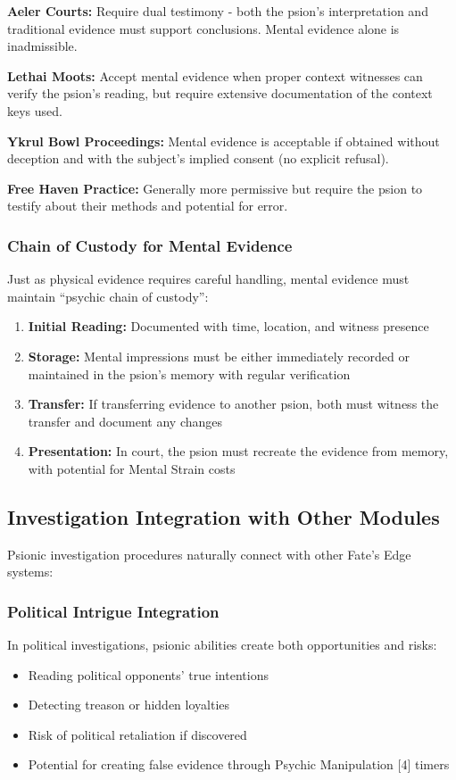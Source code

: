 \documentclass[11pt,twoside]{article}
\begin{document}
\textbf{Aeler Courts:} Require dual testimony - both the psion's interpretation and traditional evidence must support conclusions. Mental evidence alone is inadmissible.

\textbf{Lethai Moots:} Accept mental evidence when proper context witnesses can verify the psion's reading, but require extensive documentation of the context keys used.

\textbf{Ykrul Bowl Proceedings:} Mental evidence is acceptable if obtained without deception and with the subject's implied consent (no explicit refusal).

\textbf{Free Haven Practice:} Generally more permissive but require the psion to testify about their methods and potential for error.

\subsubsection{Chain of Custody for Mental Evidence}
Just as physical evidence requires careful handling, mental evidence must maintain ``psychic chain of custody'':

\begin{enumerate}
    \item \textbf{Initial Reading:} Documented with time, location, and witness presence
    \item \textbf{Storage:} Mental impressions must be either immediately recorded or maintained in the psion's memory with regular verification
    \item \textbf{Transfer:} If transferring evidence to another psion, both must witness the transfer and document any changes
    \item \textbf{Presentation:} In court, the psion must recreate the evidence from memory, with potential for Mental Strain costs
\end{enumerate}

\subsection{Investigation Integration with Other Modules}

Psionic investigation procedures naturally connect with other Fate's Edge systems:

\subsubsection{Political Intrigue Integration}
In political investigations, psionic abilities create both opportunities and risks:
\begin{itemize}
    \item Reading political opponents' true intentions
    \item Detecting treason or hidden loyalties
    \item Risk of political retaliation if discovered
    \item Potential for creating false evidence through Psychic Manipulation [4] timers
\end{itemize}
\end{document}
